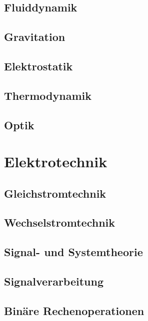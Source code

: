 \documentclass[a5paper]{report}
\begin{document}
		\chapter{Fluiddynamik}
		

		\chapter{Gravitation}
		

		\chapter{Elektrostatik}
		

		\chapter{Thermodynamik}
		

		\chapter{Optik}
		

	\part{Elektrotechnik}

		\chapter{Gleichstromtechnik}
		

		\chapter{Wechselstromtechnik}
		

		\chapter{Signal- und Systemtheorie}
		
		\chapter{Signalverarbeitung}
		
		
		\chapter{Binäre Rechenoperationen}
		
		
\end{document}
